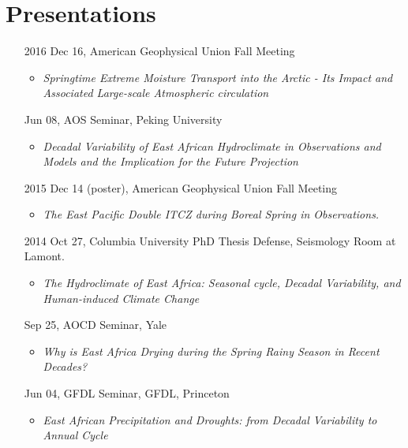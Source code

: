 \documentclass[11pt]{article}
\newcommand{\meetingName}[1]{#1}
\newcommand{\ptitle}[1]{\textit{#1}}
\begin{document}
\section{Presentations}
\begin{itemize}[leftmargin=10ex, itemsep=1ex]
    \item[2016]Dec 16, \meetingName{American Geophysical Union Fall Meeting}
    \begin{itemize}[leftmargin=4ex, parsep=0ex]
		\item \ptitle{Springtime Extreme Moisture Transport into the Arctic - Its Impact and Associated Large-scale Atmospheric circulation}
		\end{itemize}

	\item[\phantom{2016}] Jun 08, \meetingName{AOS Seminar}, Peking University
	\begin{itemize}[leftmargin=4ex]
		\item \ptitle{Decadal Variability of East African Hydroclimate in Observations and Models and the Implication for the Future Projection}
		\end{itemize}
	
	\item[2015]Dec 14 (poster),  \meetingName{American Geophysical Union Fall Meeting}
	\begin{itemize}[leftmargin=4ex]
		\item \ptitle{The East Pacific Double ITCZ during Boreal Spring in Observations.}
		\end{itemize}
	
	\item [2014] Oct 27,  \meetingName{Columbia University PhD Thesis Defense}, Seismology Room at Lamont.
	\begin{itemize}[leftmargin=4ex]
		\item \ptitle{The Hydroclimate of East Africa: Seasonal cycle, Decadal Variability, and Human-induced Climate Change}
		\end{itemize}
	
	\item[\phantom{2014}] Sep 25, \meetingName{AOCD Seminar}, Yale
	 \begin{itemize}[leftmargin=4ex]
		\item \ptitle{Why is East Africa Drying during the Spring Rainy Season in Recent Decades?}
		\end{itemize}

	\item [\phantom{2014}]Jun 04,  \meetingName{GFDL Seminar},  GFDL, Princeton
	 \begin{itemize}[leftmargin=4ex]
		\item \ptitle{East African Precipitation and Droughts: from Decadal Variability to Annual Cycle}
		\end{itemize}


\end{itemize}
\end{document}
